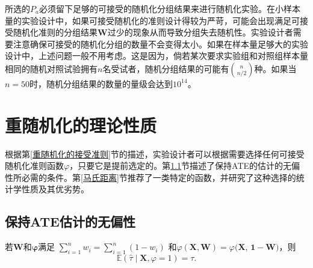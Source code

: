 所选的$P_a$必须留下足够的可接受的随机化分组结果来进行随机化实验。在小样本量的实验设计中，如果可接受随机化的准则设计得较为严苛，可能会出现满足可接受随机化准则的分组结果$\mathbf{W}$过少的现象从而导致分组失去随机性。实验设计者需要注意确保可接受的随机化分组的数量不会变得太小。如果在样本量足够大的实验设计中，上述问题一般不用考虑。这是因为，倘若某次要求实验组和对照组样本量相同的随机对照试验拥有$n$名受试者，随机分组结果的可能有$\binom{n}{n/2}$种。如果当$n=50$时，随机分组结果的数量的量级会达到$10^{14}$。


\section{重随机化的理论性质}

根据第\ref{重随机化的接受准则}节的描述，实验设计者可以根据需要选择任何可接受随机化准则函数$\varphi$，只要它是提前选定的。第\ref{无偏性}节描述了保持ATE的估计的无偏性所必需的条件。第\ref{马氏距离}节推荐了一类特定的函数，并研究了这种选择的统计学性质及其优劣势。
\subsection{保持ATE估计的无偏性}\label{无偏性}

\begin{theorem}\label{theorem 2.1}\cite{morgan2012rerandomization}
   若$\mathbf{W}$和$\mathbf{\varphi}$满足 $\sum _{i=1}^n w_i=\sum _{i=1}^n\left(1-w_i\right)$ 和$\varphi(\mathbf{X}, \mathbf{W})=\varphi(\mathbf{X}$, $\mathbf{1}-\mathbf{W})$，则 
   \begin{equation}
       \mathbb{E}(\hat{\tau} \mid \mathbf{X}, \varphi=1)=\tau.
   \end{equation} 
\end{theorem}

